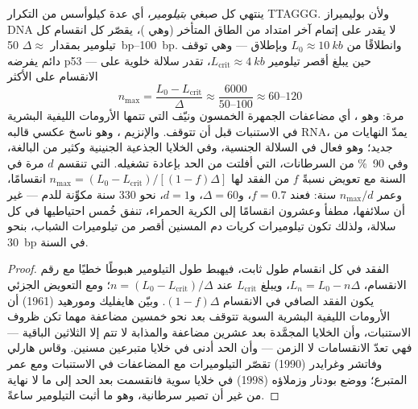 \begin{theorem}\label{thm:b3:stem-cells:hayflick}
ينتهي كل صبغي \emph{بتيلومير}، أي عدة كيلوأسس من التكرار
TTAGGG. ولأن بوليميراز DNA لا يقدر على إتمام آخر امتداد من
الطاق المتأخر (وهي \emph{})، يقصّر كل
انقسام كل تيلومير بمقدار $\Delta \approx$ \qtyrange{50}{100}{bp}.
وانطلاقًا من $L_{0} \approx \qty{10}{kb}$ وبإطلاق
\emph{} --- وهي توقف دائم يفرضه p53 ---
حين يبلغ أقصر تيلومير $L_{\text{crit}} \approx \qty{4}{kb}$،
تقدر سلالة خلوية على الانقسام على الأكثر
\[
n_{\max} = \frac{L_{0} - L_{\text{crit}}}{\Delta} \approx \frac{6000}{50\text{--}100} \approx 60\text{--}120
\]
مرة: وهو \emph{}، أي مضاعفات الجمهرة الخمسون
ونيّف التي تتمها الأرومات الليفية البشرية في الاستنبات قبل
أن تتوقف. والإنزيم \emph{}، وهو ناسخ عكسي قالبه
RNA، يمدّ النهايات من جديد؛ وهو فعال في السلالة الجنسية،
وفي الخلايا الجذعية الجنينية وكثير من البالغة، وفي
\qty{90}{\%} من السرطانات، التي أفلتت من الحد بإعادة تشغيله.
 التي تنقسم $d$ مرة في السنة مع تعويض
 نسبةً $f$ من الفقد لها
$n_{\max} = (L_{0} - L_{\text{crit}})/[(1 - f)\Delta]$
انقسامًا، وعمر $n_{\max}/d$ سنة: فعند $f = 0.7$، و$\Delta
= 60$، و$d = 1$، نحو 330 سنة  مكوِّنة للدم --- غير
أن سلائفها،  مطفأ وعشرون انقسامًا إلى الكرية
الحمراء، تنفق خُمس احتياطيها في كل سلالة، ولذلك تكون
تيلوميرات كريات دم المسنين أقصر من تيلوميرات الشباب، بنحو
\qty{30}{bp} في السنة.
\end{theorem}
\begin{proof}
الفقد في كل انقسام طول ثابت، فيهبط طول التيلومير هبوطًا
خطيًا مع رقم الانقسام، $L_{n} = L_{0} - n\Delta$، ويبلغ
$L_{\text{crit}}$ عند $n = (L_{0} - L_{\text{crit}})/\Delta$؛ ومع
التعويض الجزئي يكون الفقد الصافي في الانقسام $(1 - f)\Delta$.
وبيّن هايفليك ومورهيد (1961) أن الأرومات الليفية البشرية
السوية تتوقف بعد نحو خمسين مضاعفة مهما تكن ظروف الاستنبات،
وأن الخلايا المجمَّدة بعد عشرين مضاعفة والمذابة لا تتم إلا
الثلاثين الباقية --- فهي تعدّ الانقسامات لا الزمن --- وأن
الحد أدنى في خلايا متبرعين مسنين. وقاس هارلي وفاتشر
وغرايدر (1990) تقصّر التيلوميرات مع المضاعفات في الاستنبات
ومع عمر المتبرع؛ ووضع بودنار وزملاؤه (1998)  في
خلايا سوية فانقسمت بعد الحد إلى ما لا نهاية من غير أن تصير
سرطانية، وهو ما أثبت التيلومير ساعةً.
\end{proof}

